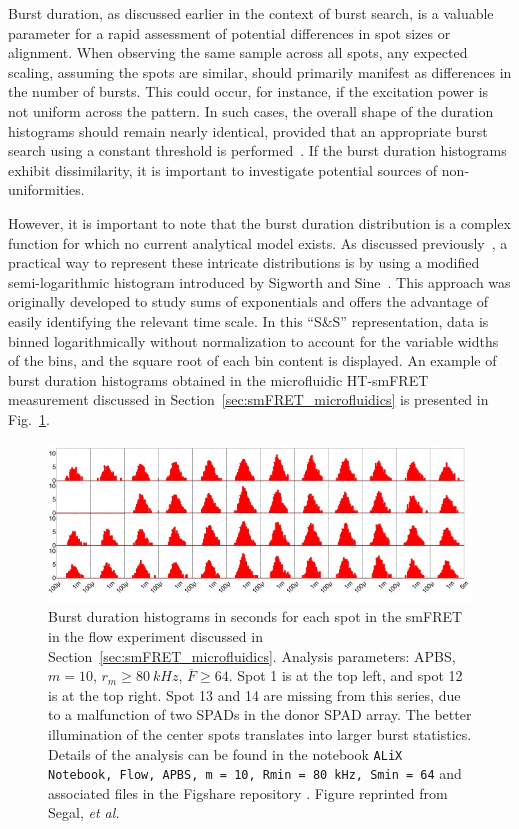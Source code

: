 Burst duration, as discussed earlier in the context of burst search, is a valuable parameter for a rapid assessment of potential differences in spot sizes or alignment. 
When observing the same sample across all spots, any expected scaling, assuming the spots are similar, should primarily manifest as differences in the number of bursts.
This could occur, for instance, if the excitation power is not uniform across the pattern. 
In such cases, the overall shape of the duration histograms should remain nearly identical, provided that an appropriate burst search using a constant threshold is performed~\cite{ingargiola_PLOS1_2016}. 
If the burst duration histograms exhibit dissimilarity, it is important to investigate potential sources of non-uniformities.

However, it is important to note that the burst duration distribution is a complex function for which no current analytical model exists. 
As discussed previously~\cite{ingargiola_PLOS1_2016}, a practical way to represent these intricate distributions is by using a modified semi-logarithmic histogram introduced by Sigworth and Sine~\cite{sigworth_BJ_1987}. 
This approach was originally developed to study sums of exponentials and offers the advantage of easily identifying the relevant time scale. 
In this \enquote{S\&S} representation, data is binned logarithmically without normalization to account for the variable widths of the bins, and the square root of each bin content is displayed. 
An example of burst duration histograms obtained in the microfluidic \ac{HT-smFRET} measurement discussed in Section~\ref{sec:smFRET_microfluidics} is presented in Fig.~\ref{fig:flow_burst_duration_48_spots}.

\begin{figure}
\centering
\includegraphics[width=\textwidth]{chapters/figures/flow_burst_duration_48_spots.jpg}
\caption{\label{fig:flow_burst_duration_48_spots}
Burst duration histograms in seconds for each spot in the \ac{smFRET} in the flow experiment discussed
in Section~\ref{sec:smFRET_microfluidics}. 
Analysis parameters: \ac{APBS}, $m = 10$, $r_m \geq 80~kHz$, $\overline{F} \geq 64$. 
Spot 1 is at the top left, and spot 12 is at the top right. Spot 13 and 14 are missing from this series, due to a malfunction of two SPADs in the donor SPAD array. 
The better illumination of the center spots translates into larger burst statistics.
Details of the analysis can be found in the notebook \texttt{ALiX Notebook, Flow, \ac{APBS}, m = 10, Rmin = 80 kHz, Smin = 64}  and associated files in the Figshare repository \cite{figshare_repo_2019}.
Figure reprinted from Segal, \textit{et al.}~\cite{segal_methods_2019}
}
\end{figure}

